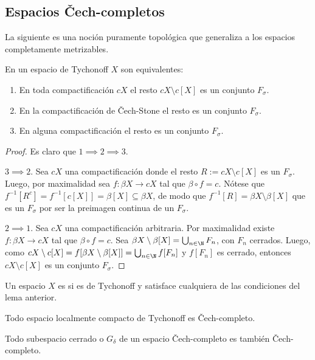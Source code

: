 \documentclass[topologia-analisis.tex]{subfiles}
\begin{document}
\begin{advanced}
\subsection{Espacios \v Cech-completos}
La siguiente es una noción puramente topológica que generaliza a los espacios completamente metrizables.

\addtocounter{thmi}{1}
\begin{slem}
	En un espacio de Tychonoff $X$ son equivalentes:
	\begin{enumerate}
		\item En toda compactificación $cX$ el resto $cX \setminus c[X]$ es un conjunto $F_\sigma$.
		\item En la compactificación de \v Cech-Stone el resto es un conjunto $F_\sigma$.
		\item En alguna compactificación el resto es un conjunto $F_\sigma$.
	\end{enumerate}
\end{slem}
\begin{proof}
	Es claro que $1 \implies 2\implies 3$.

	$3\implies 2$. Sea $cX$ una compactificación donde el resto $R := cX \setminus c[X]$ es un $F_\sigma$.
	Luego, por maximalidad sea $f\colon \beta X \to cX$ tal que $\beta\circ f = c$.
	Nótese que $f^{-1}[ R^c ] = f^{-1}[ c[X] ] = \beta[X] \subseteq \beta X$, de modo que $f^{-1}[R] = \beta X \setminus \beta[X]$
	que es un $F_\sigma$ por ser la preimagen continua de un $F_\sigma$.

	$2\implies 1$.
	Sea $cX$ una compactificación arbitraria. Por maximalidad existe $f\colon \beta X \to cX$ tal que $\beta\circ f = c$.
	Sea $\beta X \setminus \beta[X] = \bigcup_{n\in\N} F_n$, con $F_n$ cerrados.
	Luego, como $cX \setminus c[X] = f[ \beta X \setminus \beta[X] ] = \bigcup_{n\in\N} f[ F_n ]$ y $f[ F_n ]$ es cerrado,
	entonces $cX \setminus c[X]$ es un conjunto $F_\sigma$.
\end{proof}
\addtocounter{thmi}{-1}

\begin{mydef}
	Un espacio $X$ es  si es de Tychonoff y satisface cualquiera
	de las condiciones del lema anterior.
\end{mydef}
\begin{cor}
	Todo espacio localmente compacto de Tychonoff es \v Cech-completo.
\end{cor}
\begin{cor}
	Todo subespacio cerrado o $G_\delta$ de un espacio \v Cech-completo es también \v Cech-completo.
\end{cor}


\end{advanced}
\end{document}
